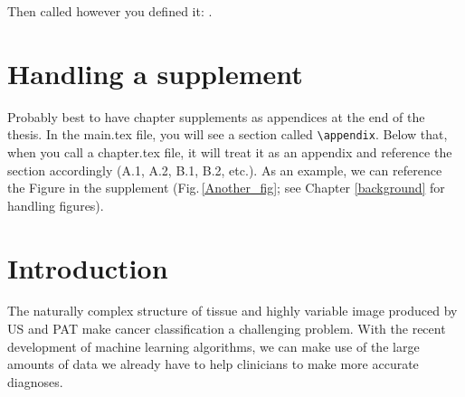 Then called however you defined it: \oddname.

\section{Handling a supplement}

Probably best to have chapter supplements as appendices at the end of the thesis. In the main.tex file, you will see a section called \verb+\appendix+. Below that, when you call a chapter.tex file, it will treat it as an appendix and reference the section accordingly (A.1, A.2, B.1, B.2, etc.). As an example, we can reference the Figure in the supplement (Fig.\,\ref{Another_fig}; see Chapter \ref{background} for handling figures). 





\section{Introduction}

The \citep{shuo2019example} naturally complex structure of tissue and highly variable image produced by US and PAT make cancer classification a challenging problem. With the recent development of machine learning algorithms, we can make use of the large amounts of data we already have to help clinicians to make more accurate diagnoses. 

